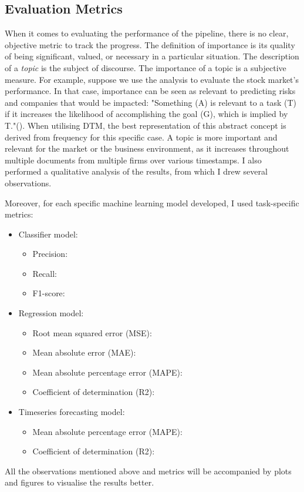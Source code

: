 \documentclass[12pt,MSc,a4paper,oneside]{muthesis}
\begin{document}
\subsection{Evaluation Metrics}

When it comes to evaluating the performance of the pipeline, there is no clear, objective metric to track the progress. The definition of importance is its quality of being significant, valued, or necessary in a particular situation. The description of a \textit{topic} is the subject of discourse. The importance of a topic is a subjective measure. For example, suppose we use the analysis to evaluate the stock market's performance. In that case, importance can be seen as relevant to predicting risks and companies that would be impacted: "Something (A) is relevant to a task (T) if it increases the likelihood of accomplishing the goal (G), which is implied by T."(\cite{Hjrland2002WorkTA}). When utilising DTM, the best representation of this abstract concept is derived from frequency for this specific case. A topic is more important and relevant for the market or the business environment, as it increases throughout multiple documents from multiple firms over various timestamps.
I also performed a qualitative analysis of the results, from which I drew several observations.
 
Moreover, for each specific machine learning model developed, I used task-specific metrics:
\begin{itemize}
    \item Classifier model:
    \begin{itemize}
        \item Precision: \cite{wiki:p&r}
        \item Recall: \cite{wiki:p&r}
        \item F1-score: \cite{wiki:f-score}
    \end{itemize}
    \item Regression model:
    \begin{itemize}
        \item Root mean squared error (MSE): \cite{wiki:mse}
        \item Mean absolute error (MAE): \cite{wiki:mae}
        \item Mean absolute percentage error (MAPE): \cite{wiki:mape}
        \item Coefficient of determination (R2): \cite{wiki:r2}
    \end{itemize}
    \item Timeseries forecasting model:
    \begin{itemize}
        \item Mean absolute percentage error (MAPE): \cite{wiki:mape}
        \item Coefficient of determination (R2): \cite{wiki:r2}
    \end{itemize}
\end{itemize}
All the observations mentioned above and metrics will be accompanied by plots and figures to visualise the results better. 
\end{document}
